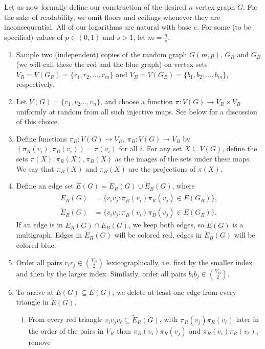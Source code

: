 \documentclass{article}
\begin{document}
Let us now formally define our construction of the desired  $n$ vertex graph $G$. For the sake of readability, we omit floors and ceilings whenever they are inconsequential. All of our logarithms are natural with base $e$. For some (to be specified) values of $p \in (0,1)$ and $s > 1$, let ${m}=\frac{n}{s}$. 
\begin{enumerate}
    \item Sample two (independent) copies of the random graph $G({m},p)$, $G_{R}$ and $G_{B}$ (we will call these the red and the blue graph) on vertex sets $V_R=V(G_R)=\{r_1,r_2,\ldots,r_{{m}} \}$ and $V_B=V(G_B)=\{b_1,b_2,\ldots,b_{{m}} \}$, respectively.
    \item Let $V(G)=\{v_1,v_2\ldots,v_n\}$, and choose a function 
    $\pi:V(G)\to V_R\times V_B$
    \label{subgraphchoice} uniformly at random from all such injective maps. 
    See below for a discussion of this choice.
    \item Define functions $\pi_R:V(G)\to V_R$, $\pi_B:V(G)\to V_B$ by $(\pi_R(v_i),\pi_B(v_i))=\pi(v_i)$ for all $i$. For any set $X\subseteq V(G)$, define the sets $\pi(X),\pi_R(X),\pi_B(X)$ as the images of the sets under these maps. We say that $\pi_R(X)$ and $\pi_B(X)$ are the projections of $\pi(X)$.
    \item Define an edge set $\tilde{E}(G)=\tilde{E}_R(G)\cup \tilde{E}_B(G)$, where
    \begin{align*}
        \tilde{E}_R(G)&=\{v_iv_j:\pi_R(v_i)\pi_R(v_j)\in E(G_R)\},\\
        \tilde{E}_B(G)&=\{v_iv_j:\pi_B(v_i)\pi_B(v_j)\in E(G_B)\}.
    \end{align*}
    If an edge is in $\tilde{E}_R(G)\cap \tilde{E}_B(G)$, we keep both edges, so $\tilde{E}(G)$ is a multigraph.
    Edges in $\tilde{E}_R(G)$ will be colored red, edges in $\tilde{E}_B(G)$ will be colored blue. 
    \item Order all pairs $r_ir_j\in {V_R\choose 2}$ lexicographically, i.e. first by the smaller index and then by the larger index. Similarly, order all pairs $b_ib_j\in {V_B\choose 2}$.
    \item To arrive at $E(G)\subseteq \tilde{E}(G)$, we delete at least one edge from every triangle in $\tilde{E}(G)$. \label{edgedelete}
    \begin{enumerate}
        \item From every red  triangle $v_iv_jv_\ell\subseteq\tilde{E}_R(G)$, 
        with $\pi_R(v_j)\pi_R(v_\ell)$ later in the order of the pairs in $V_R$ than $\pi_R(v_i)\pi_R(v_j)$ and $\pi_R(v_i)\pi_R(v_\ell)$, remove %

\end{enumerate}
\end{enumerate}
\end{document}
